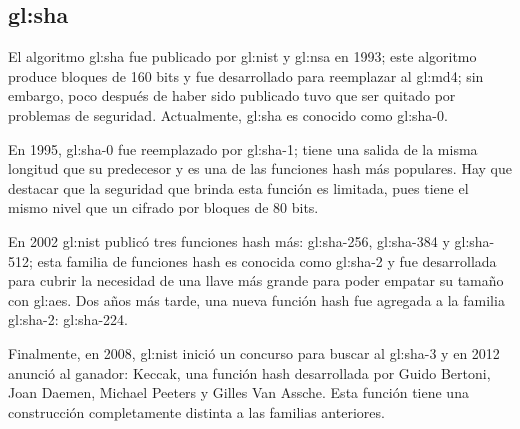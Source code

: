 %
%
%

\subsection{\texorpdfstring{\acrfull{gl:sha}}{Secure Hash Algorithm (SHA)}}

El algoritmo \gls{gl:sha} fue publicado por \gls{gl:nist} y
\gls{gl:nsa} en 1993; este algoritmo produce bloques de 160 bits y
fue desarrollado para reemplazar al \gls{gl:md4}; sin embargo, poco
después de haber sido publicado tuvo que ser quitado por problemas de
seguridad. Actualmente, \gls{gl:sha} es conocido como \gls{gl:sha}-0.

En 1995, \gls{gl:sha}-0 fue reemplazado por \gls{gl:sha}-1; tiene
una salida de la misma longitud que su predecesor y es una de las funciones
hash más populares. Hay que destacar que la seguridad que brinda esta función
es limitada, pues tiene el mismo nivel que un cifrado por bloques de 80 bits.

En 2002 \gls{gl:nist} publicó tres funciones hash más:
\gls{gl:sha}-256, \gls{gl:sha}-384 y \gls{gl:sha}-512; esta
familia de funciones hash es conocida como \gls{gl:sha}-2 y fue
desarrollada para cubrir la necesidad de una llave más grande para poder
empatar su tamaño con \gls{gl:aes}. Dos años más tarde, una nueva
función hash fue agregada a la familia \gls{gl:sha}-2:
\gls{gl:sha}-224.

Finalmente, en 2008, \gls{gl:nist} inició un concurso para buscar al
\gls{gl:sha}-3 y en 2012 anunció al ganador: Keccak, una función hash
desarrollada por Guido Bertoni, Joan Daemen, Michael Peeters y Gilles Van
Assche. Esta función tiene una construcción completamente distinta a las
familias anteriores.
